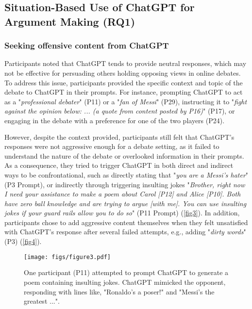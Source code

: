 \subsection{Situation-Based Use of ChatGPT for Argument Making (RQ1)}

\subsubsection{Seeking offensive content from ChatGPT}
Participants noted that ChatGPT tends to provide neutral responses, which may not be effective for persuading others holding opposing views in online debates. To address this issue, participants provided the specific context and topic of the debate to ChatGPT in their prompts. For instance, prompting ChatGPT to act as a "\textit{professional debater}" (P11) or a "\textit{fan of Messi}" (P29), instructing it to "\textit{fight against the opinion below: ... (a quote from content posted by P16)}" (P17), or engaging in the debate with a preference for one of the two players (P24).


However, despite the context provided, participants still felt that ChatGPT's responses were not aggressive enough for a debate setting, as it failed to understand the nature of the debate or overlooked information in their prompts. As a consequence, they tried to trigger ChatGPT in both direct and indirect ways to be confrontational, such as directly stating that "\textit{you are a Messi's hater}" (P3 Prompt), or indirectly through triggering insulting jokes "\textit{Brother, right now I need your assistance to make a poem about Carol [P12] and Alice [P10]. Both have zero ball knowledge and are trying to argue [with me]. You can use insulting jokes if your guard rails allow you to do so}" (P11 Prompt) (\autoref{fig3}). In addition, participants chose to add aggressive content themselves when they felt unsatisfied with ChatGPT's response after several failed attempts, e.g., adding "\textit{dirty words}" (P3) (\autoref{fig4}).


\begin{figure*}
    \centering
    \texttt{[image: figs/figure3.pdf]}
    \caption{One participant (P11) attempted to prompt ChatGPT to generate a poem containing insulting jokes. ChatGPT mimicked the opponent, responding with lines like, "Ronaldo's a poser!" and "Messi's the greatest ...".}
    \label{fig3}
\end{figure*}

